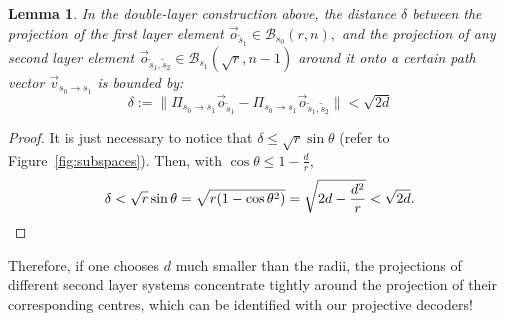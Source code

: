 \documentclass[10pt,conference]{IEEEtran}
\newtheorem{lemma}[theorem]{Lemma}
\newcommand{\1}{\mathds{1}}
\newcommand{\cB}{\mathcal{B}}
\begin{document}
\begin{lemma}\label{lemma:2-layer-delta}
In the double-layer construction above, the distance $\delta$ between the projection of the first layer element $\vec o_{\tilde s_1}\in\cB_{s_0}(r,n),$ and the projection of any second layer element $\vec o_{\tilde s_1,\tilde s_2}\in\cB_{s_1}(\sqrt{r},n-1)$ around it onto a certain path vector $\vec v_{s_0\to s_1}$ is bounded by:
\[
\delta:=\|\Pi_{s_0\to s_1}\vec o_{\tilde s_1} - \Pi_{s_0\to s_1}\vec o_{\tilde s_1,\tilde s_2}\|<\sqrt{2d}
\]
\end{lemma}
\begin{proof}
It is just necessary to notice that $\delta\leq\sqrt{r}\sin\theta$ (refer to Figure~\ref{fig:subspaces}). Then, with $\cos\theta\leq1-\frac dr$,
\begin{equation*}
\delta<\sqrt{r}\sin\theta=\sqrt{r(1-\cos\theta^2)}=
\sqrt{2d-\frac{d^2}{r}}<\sqrt{2d}.\qedhere
\end{equation*}
\end{proof}

Therefore, if one chooses $d$ much smaller than the radii, the projections of different second layer systems concentrate tightly around the projection of their corresponding centres, which can be identified with our projective decoders! 
\end{document}
